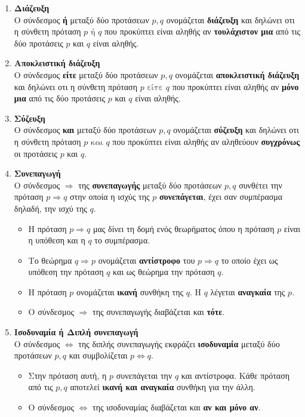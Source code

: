 \documentclass[twoside,10pt]{book}
\begin{document}
\begin{enumerate}[itemsep=0mm,label=\bf\arabic*.]
\item \textbf{Διάζευξη}\\
Ο σύνδεσμος \textbf{ή} μεταξύ δύο προτάσεων $ p,q $ ονομάζεται \textbf{διάζευξη} και δηλώνει οτι η σύνθετη πρόταση $ p\textrm{ ή }q $ που προκύπτει είναι αληθής αν \textbf{τουλάχιστον μια} από τις δύο προτάσεις $ p $ και $ q $ είναι αληθής.
\item \textbf{Αποκλειστική διάζευξη}\\
Ο σύνδεσμος \textbf{είτε} μεταξύ δύο προτάσεων $ p,q $ ονομάζεται \textbf{αποκλειστική διάζευξη} και δηλώνει οτι η σύνθετη πρόταση $ p\textrm{ είτε }q $ που προκύπτει είναι αληθής αν \textbf{μόνο μια} από τις δύο προτάσεις $ p $ και $ q $ είναι αληθής.
\item \textbf{Σύζευξη}\\
Ο σύνδεσμος \textbf{και} μεταξύ δύο προτάσεων $ p,q $ ονομάζεται \textbf{σύζευξη} και δηλώνει οτι η σύνθετη πρόταση $ p\textrm{ και }q $ που προκύπτει είναι αληθής αν αληθεύουν \textbf{συγχρόνως} οι προτάσεις $ p $ και $ q $.
\item \textbf{Συνεπαγωγή}\\
Ο σύνδεσμος $ \Rightarrow $ της \textbf{συνεπαγωγής} μεταξύ δύο προτάσεων $ p,q $ συνθέτει την πρόταση $ p\Rightarrow q $ στην οποία η ισχύς της $ p $ \textbf{συνεπάγεται}, έχει σαν συμπέρασμα δηλαδή, την ισχύ της $ q $. 
\begin{itemize}[itemsep=0mm]
\item Η πρόταση $ p\Rightarrow q $ μας δίνει τη δομή ενός θεωρήματος όπου η πρόταση $ p $ είναι η υπόθεση και η $ q $ το συμπέρασμα. 
\item Το θεώρημα $ q\Rightarrow p $ ονομάζεται \textbf{αντίστροφο} του $ p\Rightarrow q $ το οποίο έχει ως υπόθεση την πρόταση $ q $ και ως θεώρημα την πρόταση $ q $.
\item Η πρόταση $ p $ ονομάζεται \textbf{ικανή} συνθήκη της $ q $. Η $ q $ λέγεται \textbf{αναγκαία} της $ p $.
\item Ο σύνδεσμος $ \Rightarrow $ της συνεπαγωγής διαβάζεται και \textbf{τότε}.
\end{itemize}
\item \textbf{Ισοδυναμία ή Διπλή συνεπαγωγή}\\
Ο σύνδεσμος $ \Leftrightarrow $ της διπλής συνεπαγωγής εκφράζει \textbf{ισοδυναμία} μεταξύ δύο προτάσεων $ p,q $ και συμβολίζεται $ p\Leftrightarrow q $. \begin{itemize}[itemsep=0mm]
\item Στην πρόταση αυτή, η $ p $ συνεπάγεται την $ q $ και αντίστροφα. Κάθε πρόταση από τις $ p,q $ αποτελεί \textbf{ικανή και αναγκαία} συνθήκη για την άλλη.
\item Ο σύνδεσμος $ \Leftrightarrow $ της ισοδυναμίας διαβάζεται και \textbf{αν και μόνο αν}.
\end{itemize}
\end{enumerate}
\end{document}
